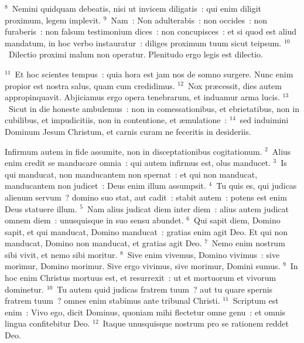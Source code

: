 ${}^{8}$~Nemini quidquam debeatis, nisi ut invicem diligatis~: qui enim diligit proximum, legem implevit.
${}^{9}$~Nam~: Non adulterabis~: non occides~: non furaberis~: non falsum testimonium dices~: non concupisces~: et si quod est aliud mandatum, in hoc verbo instauratur~: diliges proximum tuum sicut teipsum.
${}^{10}$~Dilectio proximi malum non operatur. Plenitudo ergo legis est dilectio.


${}^{11}$~Et hoc scientes tempus~: quia hora est jam nos de somno surgere. Nunc enim propior est nostra salus, quam cum credidimus.
${}^{12}$~Nox pr\ae cessit, dies autem appropinquavit. Abjiciamus ergo opera tenebrarum, et induamur arma lucis.
${}^{13}$~Sicut in die honeste ambulemus~: non in comessationibus, et ebrietatibus, non in cubilibus, et impudicitiis, non in contentione, et \ae mulatione~:
${}^{14}$~sed induimini Dominum Jesum Christum, et carnis curam ne feceritis in desideriis.

\lettrine[lines=10,image=true,loversize=0.05,lraise=-0.03]{I}{}nfirmum autem in fide assumite, non in disceptationibus cogitationum.
${}^{2}$~Alius enim credit se manducare omnia~: qui autem infirmus est, olus manducet.
${}^{3}$~Is qui manducat, non manducantem non spernat~: et qui non manducat, manducantem non judicet~: Deus enim illum assumpsit.
${}^{4}$~Tu quis es, qui judicas alienum servum~? domino suo stat, aut cadit~: stabit autem~: potens est enim Deus statuere illum.
${}^{5}$~Nam alius judicat diem inter diem~: alius autem judicat omnem diem~: unusquisque in suo sensu abundet.
${}^{6}$~Qui sapit diem, Domino sapit, et qui manducat, Domino manducat~: gratias enim agit Deo. Et qui non manducat, Domino non manducat, et gratias agit Deo.
${}^{7}$~Nemo enim nostrum sibi vivit, et nemo sibi moritur.
${}^{8}$~Sive enim vivemus, Domino vivimus~: sive morimur, Domino morimur. Sive ergo vivimus, sive morimur, Domini sumus.
${}^{9}$~In hoc enim Christus mortuus est, et resurrexit~: ut et mortuorum et vivorum dominetur.
${}^{10}$~Tu autem quid judicas fratrem tuum~? aut tu quare spernis fratrem tuum~? omnes enim stabimus ante tribunal Christi.
${}^{11}$~Scriptum est enim~: Vivo ego, dicit Dominus, quoniam mihi flectetur omne genu~: et omnis lingua confitebitur Deo.
${}^{12}$~Itaque unusquisque nostrum pro se rationem reddet Deo.


